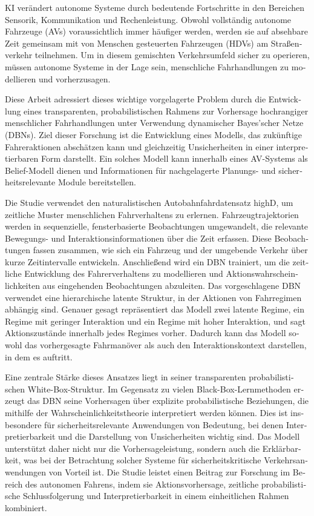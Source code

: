 \cleardoublepage

\begin{otherlanguage}{ngerman}

\ac{KI} verändert autonome Systeme durch bedeutende Fortschritte in den Bereichen Sensorik, Kommunikation und Rechenleistung. Obwohl vollständig autonome Fahrzeuge (\acp{AV}) voraussichtlich immer häufiger werden, werden sie auf absehbare Zeit gemeinsam mit von Menschen gesteuerten Fahrzeugen (\acp{HDV}) am Straßenverkehr teilnehmen. Um in diesem gemischten Verkehrsumfeld sicher zu operieren, müssen autonome Systeme in der Lage sein, menschliche Fahrhandlungen zu modellieren und vorherzusagen.
\par Diese Arbeit adressiert dieses wichtige vorgelagerte Problem durch die Entwicklung eines transparenten, probabilistischen Rahmens zur Vorhersage hochrangiger menschlicher Fahrhandlungen unter Verwendung dynamischer Bayes’scher Netze (\acp{DBN}). Ziel dieser Forschung ist die Entwicklung eines Modells, das zukünftige Fahreraktionen abschätzen kann und gleichzeitig Unsicherheiten in einer interpretierbaren Form darstellt. Ein solches Modell kann innerhalb eines \ac{AV}-Systems als Belief-Modell dienen und Informationen für nachgelagerte Planungs- und sicherheitsrelevante Module bereitstellen.
\par Die Studie verwendet den naturalistischen Autobahnfahrdatensatz highD, um zeitliche Muster menschlichen Fahrverhaltens zu erlernen. Fahrzeugtrajektorien werden in sequenzielle, fensterbasierte Beobachtungen umgewandelt, die relevante Bewegungs- und Interaktionsinformationen über die Zeit erfassen. Diese Beobachtungen fassen zusammen, wie sich ein Fahrzeug und der umgebende Verkehr über kurze Zeitintervalle entwickeln. Anschließend wird ein \ac{DBN} trainiert, um die zeitliche Entwicklung des Fahrerverhaltens zu modellieren und Aktionswahrscheinlichkeiten aus eingehenden Beobachtungen abzuleiten. Das vorgeschlagene \ac{DBN} verwendet eine hierarchische latente Struktur, in der Aktionen von Fahrregimen abhängig sind. Genauer gesagt repräsentiert das Modell zwei latente Regime, ein Regime mit geringer Interaktion und ein Regime mit hoher Interaktion, und sagt Aktionszustände innerhalb jedes Regimes vorher. Dadurch kann das Modell sowohl das vorhergesagte Fahrmanöver als auch den Interaktionskontext darstellen, in dem es auftritt.
\par Eine zentrale Stärke dieses Ansatzes liegt in seiner transparenten probabilistischen White-Box-Struktur. Im Gegensatz zu vielen Black-Box-Lernmethoden erzeugt das \ac{DBN} seine Vorhersagen über explizite probabilistische Beziehungen, die mithilfe der Wahrscheinlichkeitstheorie interpretiert werden können. Dies ist insbesondere für sicherheitsrelevante Anwendungen von Bedeutung, bei denen Interpretierbarkeit und die Darstellung von Unsicherheiten wichtig sind. Das Modell unterstützt daher nicht nur die Vorhersageleistung, sondern auch die Erklärbarkeit, was bei der Betrachtung solcher Systeme für sicherheitskritische Verkehrsanwendungen von Vorteil ist. Die Studie leistet einen Beitrag zur Forschung im Bereich des autonomen Fahrens, indem sie Aktionsvorhersage, zeitliche probabilistische Schlussfolgerung und Interpretierbarkeit in einem einheitlichen Rahmen kombiniert.

\end{otherlanguage}
